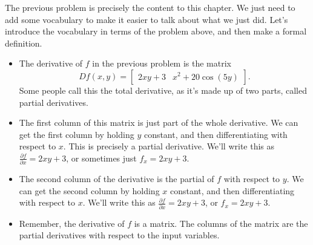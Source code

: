 The previous problem is precisely the content to this chapter.  We just need to add some vocabulary to make it easier to talk about what we just did. Let's introduce the vocabulary in terms of the problem above, and then make a formal definition.
\begin{itemize}
 \item The derivative of $f$ in the previous problem is the matrix 
 $$Df(x,y) = \begin{bmatrix}
  2xy+3& 
  x^2+20\cos(5y)
 \end{bmatrix}.$$ 
 Some people call this the total derivative, as it's made up of two parts, called partial derivatives. 
 \item The first column of this matrix is just part of the whole derivative. We can get the first column by holding $y$ constant, and then differentiating with respect to $x$. This is precisely a partial derivative.  We'll write this as $\frac{\partial f}{\partial x} = 2xy+3$, or sometimes just $f_x = 2xy+3$.
 \item The second column of the derivative is the partial of $f$ with respect to $y$. We can get the second column by holding $x$ constant, and then differentiating with respect to $x$. We'll write this as $\frac{\partial f}{\partial x} = 2xy+3$, or $f_x = 2xy+3$.
 \item Remember, the derivative of $f$ is a matrix. The columns of the matrix are the partial derivatives with respect to the input variables. 
\end{itemize}

